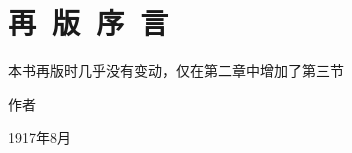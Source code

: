 \chapter[再版序言]{再~版~序~言} %


本书再版时几乎没有变动，仅在第二章中增加了第三节

\mbox{} 

\leftskip=80mm 作者

\leftskip=73mm 1917年8月